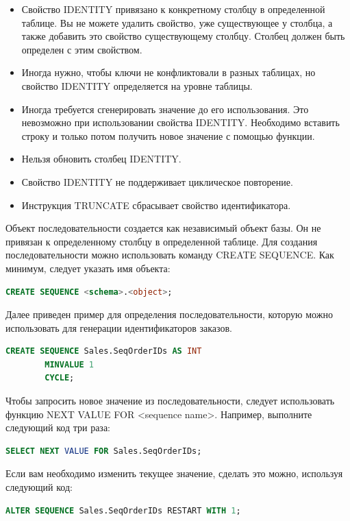 \begin{itemize}
	\item Свойство IDENTITY привязано к конкретному столбцу в определенной таблице.
	Вы не можете удалить свойство, уже существующее у столбца, а также добавить
	это свойство существующему столбцу. Столбец должен быть определен с этим
	свойством.
	\item Иногда нужно, чтобы ключи не конфликтовали в разных таблицах, но свойство
	IDENTITY определяется на уровне таблицы. 
	\item Иногда требуется сгенерировать значение до его использования. Это невозможно при использовании свойства IDENTITY. Необходимо вставить строку и только
	потом получить новое значение с помощью функции. 
	\item Нельзя обновить столбец IDENTITY. 
	\item Свойство IDENTITY не поддерживает циклическое повторение. 
	\item Инструкция TRUNCATE сбрасывает свойство идентификатора. 
\end{itemize}

Объект последовательности создается как независимый объект базы. Он не привязан к определенному столбцу в определенной таблице. Для создания последовательности можно использовать команду CREATE SEQUENCE. Как минимум, следует
указать имя объекта: 

\begin{lstlisting}[label=lst:funcReturn, language=sql]
	CREATE SEQUENCE <schema>.<object>;
\end{lstlisting}

Далее приведен пример для определения последовательности, которую можно использовать для генерации идентификаторов заказов. 

\begin{lstlisting}[label=lst:funcReturn, language=sql]
	CREATE SEQUENCE Sales.SeqOrderIDs AS INT
 		MINVALUE 1
 		CYCLE;
\end{lstlisting}


Чтобы запросить новое значение из последовательности, следует использовать
функцию NEXT VALUE FOR <sequence name>. Например, выполните следующий код
три раза:

\begin{lstlisting}[label=lst:funcReturn, language=sql]
	SELECT NEXT VALUE FOR Sales.SeqOrderIDs; 
\end{lstlisting}

Если вам необходимо изменить текущее значение, сделать это можно, используя следующий код: 
\begin{lstlisting}[label=lst:funcReturn, language=sql]
	ALTER SEQUENCE Sales.SeqOrderIDs RESTART WITH 1;  
\end{lstlisting}


